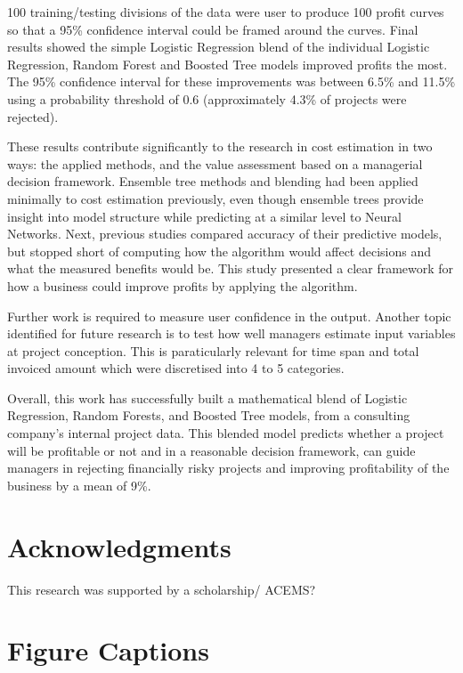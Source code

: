 \documentclass[]{elsarticle} %
\begin{document}
100 training/testing divisions of the data were user to produce 100
profit curves so that a 95\% confidence interval could be framed around
the curves. Final results showed the simple Logistic Regression blend of
the individual Logistic Regression, Random Forest and Boosted Tree
models improved profits the most. The 95\% confidence interval for these
improvements was between 6.5\% and 11.5\% using a probability threshold
of 0.6 (approximately 4.3\% of projects were rejected).

These results contribute significantly to the research in cost
estimation in two ways: the applied methods, and the value assessment
based on a managerial decision framework. Ensemble tree methods and
blending had been applied minimally to cost estimation previously, even
though ensemble trees provide insight into model structure while
predicting at a similar level to Neural Networks. Next, previous studies
compared accuracy of their predictive models, but stopped short of
computing how the algorithm would affect decisions and what the measured
benefits would be. This study presented a clear framework for how a
business could improve profits by applying the algorithm.

Further work is required to measure user confidence in the output.
Another topic identified for future research is to test how well
managers estimate input variables at project conception. This is
paraticularly relevant for time span and total invoiced amount which
were discretised into 4 to 5 categories.

Overall, this work has successfully built a mathematical blend of
Logistic Regression, Random Forests, and Boosted Tree models, from a
consulting company's internal project data. This blended model predicts
whether a project will be profitable or not and in a reasonable decision
framework, can guide managers in rejecting financially risky projects
and improving profitability of the business by a mean of 9\%.

\section{Acknowledgments}\label{acknowledgments}

This research was supported by a scholarship/ ACEMS?

\section{Figure Captions}\label{figure-captions}
\end{document}
